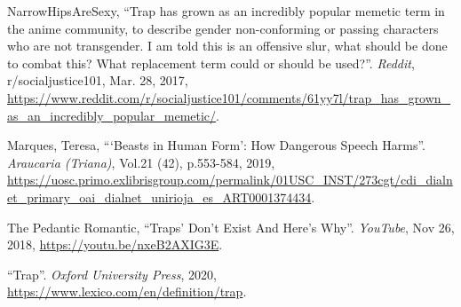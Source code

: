\documentclass[12pt, letterpaper]{article}
\begin{document}
\begin{mla}
\begin{workscited}
	\bibent NarrowHipsAreSexy, ``Trap has grown as an incredibly popular
	memetic term in the anime community, to describe gender non-conforming
	or passing characters who are not transgender. I am told this is an
	offensive slur, what should be done to combat this? What replacement term
	could or should be used?''.
	\textit{Reddit}, r/socialjustice101, Mar. 28, 2017,
	\url{https://www.reddit.com/r/socialjustice101/comments/61yy7l/trap_has_grown_as_an_incredibly_popular_memetic/}.

	\bibent Marques, Teresa, ```Beasts in Human Form': How Dangerous Speech Harms''.
	\textit{Araucaria (Triana)}, Vol.21 (42), p.553-584, 2019,
	\url{https://uosc.primo.exlibrisgroup.com/permalink/01USC_INST/273cgt/cdi_dialnet_primary_oai_dialnet_unirioja_es_ART0001374434}.

	\bibent The Pedantic Romantic, ``Traps' Don't Exist And Here's Why''.
	\textit{YouTube}, Nov 26, 2018,
	\url{https://youtu.be/nxeB2AXIG3E}.

	\bibent ``Trap''.
	\textit{Oxford University Press}, 2020,
	\url{https://www.lexico.com/en/definition/trap}.
\end{workscited}


\end{mla}
\end{document}
